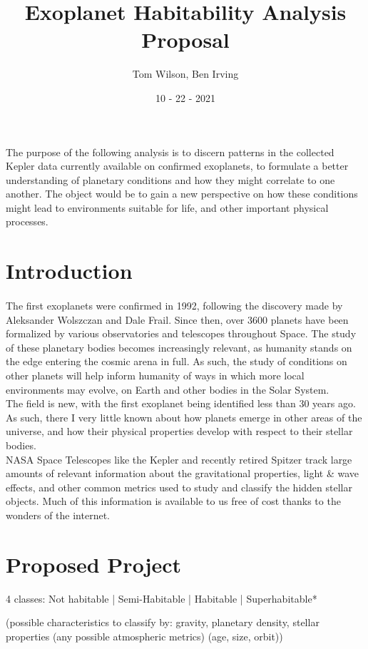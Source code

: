 \documentclass[12pt]{article}
\title{Exoplanet Habitability Analysis Proposal}
\author{Tom Wilson, Ben Irving}
\date{10 - 22 - 2021}
\begin{document}
\maketitle

\abstract
The purpose of the following analysis is to discern patterns in the collected Kepler data currently available on confirmed exoplanets, to formulate a better understanding of planetary conditions and how they might correlate to one another. The object would be to gain a new perspective on how these conditions might lead to environments suitable for life, and other important physical processes. 
\section{Introduction}
\paragraph*{}

 \indent The first exoplanets were confirmed in 1992, following the discovery made by Aleksander Wolszczan and Dale Frail. Since then, over 3600 planets have been formalized by various observatories and telescopes throughout Space. The study of these planetary bodies becomes increasingly relevant, as humanity stands on the edge entering the cosmic arena in full. As such, the study of conditions on other planets will help inform humanity of ways in which more local environments may evolve, on Earth and other bodies in the Solar System. 
\\
\indent The field is new, with the first exoplanet being identified less than 30 years ago. As such, there I very little known about how planets emerge in other areas of the universe, and how their physical properties develop with respect to their stellar bodies. \\
\indent NASA Space Telescopes like the Kepler and recently retired Spitzer track large amounts of relevant information about the gravitational properties, light \& wave effects, and other common metrics used to study and classify the hidden stellar objects. Much of this information is available to us free of cost thanks to the wonders of the internet.
\section{Proposed Project}
4 classes: 
Not habitable | Semi-Habitable | Habitable | Superhabitable*

(possible characteristics to classify by: gravity, planetary density, stellar properties 
(any possible atmospheric metrics)
(age, size, orbit))
\end{document}
